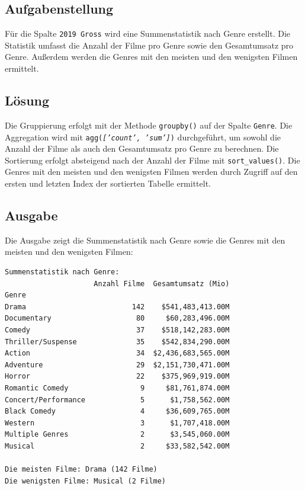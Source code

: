 \subsection{Aufgabenstellung}

Für die Spalte \texttt{2019 Gross} wird eine Summenstatistik nach Genre erstellt. Die Statistik umfasst die Anzahl der Filme pro Genre sowie den Gesamtumsatz pro Genre. Außerdem werden die Genres mit den meisten und den wenigsten Filmen ermittelt.

\subsection{Lösung}

Die Gruppierung erfolgt mit der Methode \texttt{groupby()} auf der Spalte \texttt{Genre}. Die Aggregation wird mit \texttt{agg(\textit{['count', 'sum']})} durchgeführt, um sowohl die Anzahl der Filme als auch den Gesamtumsatz pro Genre zu berechnen. Die Sortierung erfolgt absteigend nach der Anzahl der Filme mit \texttt{sort\_values()}. Die Genres mit den meisten und den wenigsten Filmen werden durch Zugriff auf den ersten und letzten Index der sortierten Tabelle ermittelt.



\subsection{Ausgabe}

Die Ausgabe zeigt die Summenstatistik nach Genre sowie die Genres mit den meisten und den wenigsten Filmen:

\begin{verbatim}
Summenstatistik nach Genre:
                     Anzahl Filme  Gesamtumsatz (Mio)
Genre                                                
Drama                         142    $541,483,413.00M
Documentary                    80     $60,283,496.00M
Comedy                         37    $518,142,283.00M
Thriller/Suspense              35    $542,834,290.00M
Action                         34  $2,436,683,565.00M
Adventure                      29  $2,151,730,471.00M
Horror                         22    $375,969,919.00M
Romantic Comedy                 9     $81,761,874.00M
Concert/Performance             5      $1,758,562.00M
Black Comedy                    4     $36,609,765.00M
Western                         3      $1,707,418.00M
Multiple Genres                 2      $3,545,060.00M
Musical                         2     $33,582,542.00M

Die meisten Filme: Drama (142 Filme)
Die wenigsten Filme: Musical (2 Filme)
\end{verbatim}


